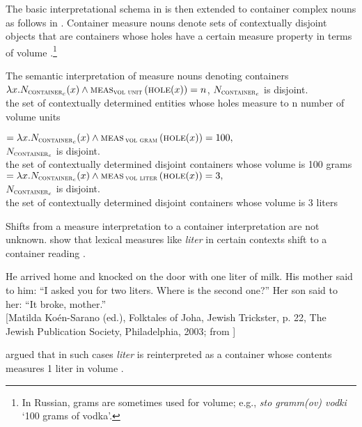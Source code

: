 \documentclass[output=paper,
colorlinks,
citecolor=brown,
newtxmath
]{langscibook}
\begin{document}
\noindent The basic interpretational schema in  is then extended to container complex nouns as follows in . Container measure nouns denote sets of contextually disjoint objects that are containers whose holes have a certain measure property in terms of volume .\footnote{In Russian, grams are sometimes used for volume; e.g., \textit{sto gramm(ov) vodki} `100 grams of vodka'.}

\ea\label{ex:22} The semantic interpretation of measure nouns denoting containers\\
$\lambda x. N_{\textsc{container}_{c}} (x) \wedge \textsc{meas}_{\textsc{vol unit}}\,(\textsc{hole}(x)) = n$, {\small $N_{\textsc{container}_{c}}$ is disjoint.\\
the set of contextually determined entities whose holes measure to n number of volume units}
\z

\ea\label{ex:23}
    \ea\label{ex:23a}  $= \lambda x. N_{\textsc{container}_{c}}(x) \wedge \textsc{meas}\,_{\textsc{vol gram}}\,(\textsc{hole}(x)) = 100,$\\
    \hspace{7.8em} {\small $N_{\textsc{container}_{c}}$ is disjoint. \\
    the set of contextually determined disjoint containers whose volume is 100 grams}
    \ex\label{ex:23b}  $= \lambda x. N_{\textsc{container}_{c}}(x) \wedge \textsc{meas}\,_{\textsc{vol liter}}\,(\textsc{hole}(x)) = 3,$\\
    \hspace{6.4em} {\small $N_{\textsc{container}_{c}}$ is disjoint.\\
    the set of contextually determined disjoint containers whose volume is 3 liters}
\z\z

\noindent Shifts from a measure interpretation to a container interpretation are not unknown. \citet{Khrizman.etal2015} show that lexical measures like \textit{liter} in certain contexts shift to a container reading .

\ea\label{ex:24} He arrived home and knocked on the door with one liter of milk. His mother said to him: ``I asked you for two liters. Where is the second one?'' Her son said to her: ``It broke, mother.'' \\
{\small [Matilda Koén-Sarano (ed.), Folktales of Joha, Jewish Trickster, p. 22, The Jewish Publication Society, Philadelphia, 2003; from \citealt[200]{Khrizman.etal2015}]}
\z

\noindent \citet{Khrizman.etal2015} argued that in such cases \textit{liter} is reinterpreted as a container whose contents measures 1 liter in volume .
\end{document}
